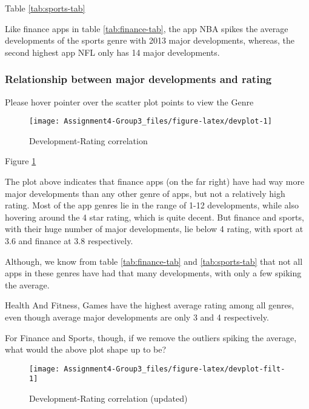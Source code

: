 \documentclass[
]{article}
\begin{document}
Table \ref{tab:sports-tab}

Like finance apps in table \ref{tab:finance-tab}, the app NBA spikes the average developments of the sports genre with 2013 major developments, whereas, the second highest app NFL only has 14 major developments.

\hypertarget{relationship-between-major-developments-and-rating}{%
\subsubsection{Relationship between major developments and rating}\label{relationship-between-major-developments-and-rating}}

Please hover pointer over the scatter plot points to view the Genre

\begin{figure}

{\centering \texttt{[image: Assignment4-Group3\_files/figure-latex/devplot-1]} 

}

\caption{Development-Rating correlation}\label{fig:devplot}
\end{figure}

Figure \ref{fig:devplot}

The plot above indicates that finance apps (on the far right) have had way more major developments than any other genre of apps, but not a relatively high rating.
Most of the app genres lie in the range of 1-12 developments, while also hovering around the 4 star rating, which is quite decent.
But finance and sports, with their huge number of major developments, lie below 4 rating, with sport at 3.6 and finance at 3.8 respectively.

Although, we know from table \ref{tab:finance-tab} and \ref{tab:sports-tab} that not all apps in these genres have had that many developments, with only a few spiking the average.

Health And Fitness, Games have the highest average rating among all genres, even though average major developments are only 3 and 4 respectively.

For Finance and Sports, though, if we remove the outliers spiking the average, what would the above plot shape up to be?

\begin{figure}

{\centering \texttt{[image: Assignment4-Group3\_files/figure-latex/devplot-filt-1]} 

}

\caption{Development-Rating correlation (updated)}\label{fig:devplot-filt}
\end{figure}
\end{document}
